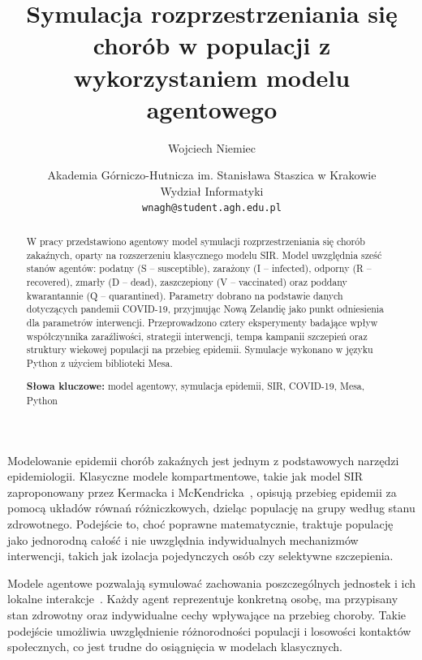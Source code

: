 \documentclass[polish]{projectreport}
\author{Wojciech Niemiec}
\title{Symulacja rozprzestrzeniania się chorób w populacji
z wykorzystaniem modelu agentowego}
\date{
    {\small Akademia Górniczo-Hutnicza im. Stanisława Staszica w Krakowie \\
    Wydział Informatyki \\
    \texttt{wnagh@student.agh.edu.pl}\\[2ex]%
    \the\year}
}
\begin{document}
\maketitle
\thispagestyle{empty}

\begin{abstract}
\noindent W pracy przedstawiono agentowy model symulacji
rozprzestrzeniania się chorób zakaźnych, oparty na rozszerzeniu
klasycznego modelu SIR. Model uwzględnia sześć stanów agentów:
podatny (S -- susceptible), zarażony (I -- infected), odporny
(R -- recovered), zmarły (D -- dead), zaszczepiony (V -- vaccinated)
oraz poddany kwarantannie (Q -- quarantined). Parametry dobrano
na podstawie danych dotyczących pandemii COVID-19, przyjmując
Nową Zelandię jako punkt odniesienia dla parametrów interwencji. Przeprowadzono cztery eksperymenty badające wpływ
współczynnika zaraźliwości, strategii interwencji, tempa kampanii
szczepień oraz struktury wiekowej populacji na przebieg epidemii.
Symulacje wykonano w języku Python z użyciem biblioteki Mesa.

\noindent\textbf{Słowa kluczowe:} model agentowy, symulacja epidemii,
SIR, COVID-19, Mesa, Python
\end{abstract}

\section{\SectionTitleIntroduction}
\label{sec:introduction}

Modelowanie epidemii chorób zakaźnych jest jednym z podstawowych
narzędzi epidemiologii. Klasyczne modele kompartmentowe, takie jak
model SIR zaproponowany przez Kermacka i McKendricka~\cite{kermack1927contribution},
opisują przebieg epidemii za pomocą układów równań różniczkowych,
dzieląc populację na grupy według stanu zdrowotnego. Podejście to,
choć poprawne matematycznie, traktuje populację jako jednorodną
całość i nie uwzględnia indywidualnych mechanizmów interwencji,
takich jak izolacja pojedynczych osób czy selektywne szczepienia.

Modele agentowe pozwalają symulować zachowania poszczególnych
jednostek i ich lokalne interakcje~\cite{railsback2011agent}.
Każdy agent reprezentuje konkretną osobę, ma przypisany stan
zdrowotny oraz indywidualne cechy wpływające na przebieg choroby.
Takie podejście umożliwia uwzględnienie różnorodności populacji
i losowości kontaktów społecznych, co jest trudne do osiągnięcia
w modelach klasycznych.
\end{document}
